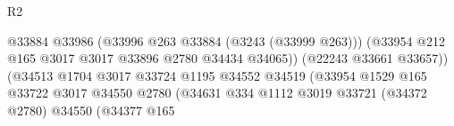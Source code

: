 \begin{lexlean}{R2}
\begin{coremodule}
                                                            @33884
                                                            @33986
                                                            (@33996
                                                              @263
                                                              @33884
                                                              (@3243 (@33999 @263)))
                                                            (@33954
                                                              @212
                                                              @165
                                                              @3017
                                                              @3017
                                                              @33896
                                                              @2780
                                                              @34434
                                                              @34065))
                                                          (@22243 @33661 @33657))
                                                        (@34513
                                                          @1704
                                                          @3017
                                                          @33724
                                                          @1195
                                                          @34552
                                                          @34519
                                                          (@33954
                                                            @1529
                                                            @165
                                                            @33722
                                                            @3017
                                                            @34550
                                                            @2780
                                                            (@34631
                                                              @334
                                                              @1112
                                                              @3019
                                                              @33721
                                                              (@34372 @2780)
                                                              @34550
                                                              (@34377
                                                                @165

\end{coremodule}
\end{lexlean}
